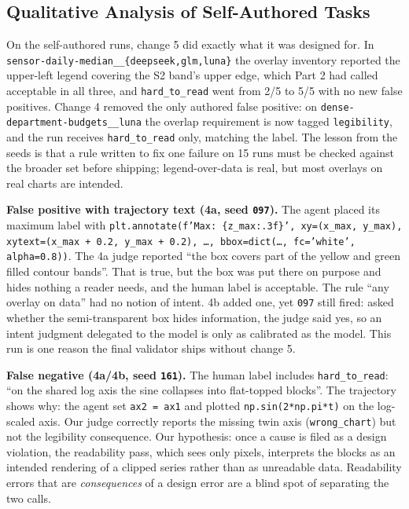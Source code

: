 \documentclass[11pt]{article}
\newcommand{\run}[1]{\texttt{#1}}
\begin{document}
\subsection{Qualitative Analysis of Self-Authored Tasks}
On the self-authored runs, change 5 did exactly what it was designed for. In
\run{sensor-daily-median\_\_\{deepseek,glm,luna\}} the overlay inventory reported
the upper-left legend covering the S2 band's upper edge, which Part 2 had
called acceptable in all three, and \texttt{hard\_to\_read} went from 2/5 to 5/5
with no new false positives. Change 4 removed the only authored false
positive: on \run{dense-department-budgets\_\_luna} the overlap requirement is
now tagged \texttt{legibility}, and the run receives \texttt{hard\_to\_read} only,
matching the label. The lesson from the seeds is that a rule written to fix one
failure on 15 runs must be checked against the broader set before shipping;
legend-over-data is real, but most overlays on real charts are intended.

\textbf{False positive with trajectory text (4a, seed \run{097}).} The
agent placed its maximum label with
\texttt{plt.annotate(f'Max: \{z\_max:.3f\}', xy=(x\_max, y\_max), xytext=(x\_max
+ 0.2, y\_max + 0.2), \ldots, bbox=dict(\ldots, fc='white', alpha=0.8))}. The
4a judge reported ``the box covers part of the yellow and green filled contour
bands''. That is true, but the box was put there on purpose and hides nothing
a reader needs, and the human label is acceptable. The rule ``any overlay on
data'' had no notion of intent. 4b added one, yet \run{097} still fired: asked
whether the semi-transparent box hides information, the judge said yes, so an
intent judgment delegated to the model is only as calibrated as the model.
This run is one reason the final validator ships without change 5.

\textbf{False negative (4a/4b, seed \run{161}).} The human label includes
\texttt{hard\_to\_read}: ``on the shared log axis the sine collapses into
flat-topped blocks''. The trajectory shows why: the agent set \texttt{ax2 = ax1}
and plotted \texttt{np.sin(2*np.pi*t)} on the log-scaled axis. Our judge
correctly reports the missing twin axis (\texttt{wrong\_chart}) but not the
legibility consequence. Our hypothesis: once a cause is filed as a design
violation, the readability pass, which sees only pixels, interprets the blocks
as an intended rendering of a clipped series rather than as unreadable data.
Readability errors that are \emph{consequences} of a design error are a
blind spot of separating the two calls.
\end{document}
